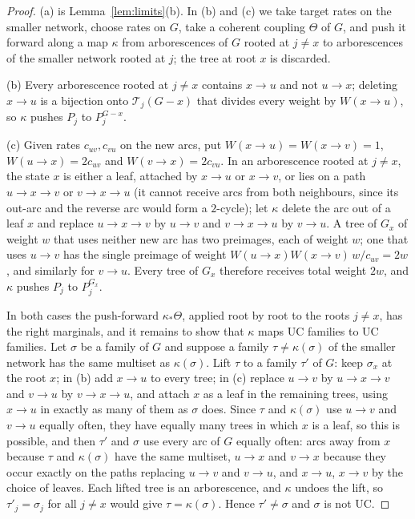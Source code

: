 \documentclass[11pt]{amsart}
\theoremstyle{definition}
\theoremstyle{remark}
\newcommand{\T}{\mathcal T}
\begin{document}
\begin{proof}
(a) is Lemma~\ref{lem:limits}(b). In (b) and (c) we take target rates on the smaller network, choose rates on $G$, take a coherent coupling $\Theta$ of $G$, and push it forward along a map $\kappa$ from arborescences of $G$ rooted at $j\neq x$ to arborescences of the smaller network rooted at $j$; the tree at root $x$ is discarded.

(b) Every arborescence rooted at $j\neq x$ contains $x\to u$ and not $u\to x$; deleting $x\to u$ is a bijection onto $\T_j(G-x)$ that divides every weight by $W(x\to u)$, so $\kappa$ pushes $P_j$ to $P^{G-x}_j$.

(c) Given rates $c_{uv},c_{vu}$ on the new arcs, put $W(x\to u)=W(x\to v)=1$, $W(u\to x)=2c_{uv}$ and $W(v\to x)=2c_{vu}$. In an arborescence rooted at $j\neq x$, the state $x$ is either a leaf, attached by $x\to u$ or $x\to v$, or lies on a path $u\to x\to v$ or $v\to x\to u$ (it cannot receive arcs from both neighbours, since its out-arc and the reverse arc would form a $2$-cycle); let $\kappa$ delete the arc out of a leaf $x$ and replace $u\to x\to v$ by $u\to v$ and $v\to x\to u$ by $v\to u$. A tree of $G_x$ of weight $w$ that uses neither new arc has two preimages, each of weight $w$; one that uses $u\to v$ has the single preimage of weight $W(u\to x)W(x\to v)\,w/c_{uv}=2w$, and similarly for $v\to u$. Every tree of $G_x$ therefore receives total weight $2w$, and $\kappa$ pushes $P_j$ to $P^{G_x}_j$.

In both cases the push-forward $\kappa_\ast\Theta$, applied root by root to the roots $j\neq x$, has the right marginals, and it remains to show that $\kappa$ maps UC families to UC families. Let $\sigma$ be a family of $G$ and suppose a family $\tau\neq\kappa(\sigma)$ of the smaller network has the same multiset as $\kappa(\sigma)$. Lift $\tau$ to a family $\tau'$ of $G$: keep $\sigma_x$ at the root $x$; in (b) add $x\to u$ to every tree; in (c) replace $u\to v$ by $u\to x\to v$ and $v\to u$ by $v\to x\to u$, and attach $x$ as a leaf in the remaining trees, using $x\to u$ in exactly as many of them as $\sigma$ does. Since $\tau$ and $\kappa(\sigma)$ use $u\to v$ and $v\to u$ equally often, they have equally many trees in which $x$ is a leaf, so this is possible, and then $\tau'$ and $\sigma$ use every arc of $G$ equally often: arcs away from $x$ because $\tau$ and $\kappa(\sigma)$ have the same multiset, $u\to x$ and $v\to x$ because they occur exactly on the paths replacing $u\to v$ and $v\to u$, and $x\to u$, $x\to v$ by the choice of leaves. Each lifted tree is an arborescence, and $\kappa$ undoes the lift, so $\tau'_j=\sigma_j$ for all $j\neq x$ would give $\tau=\kappa(\sigma)$. Hence $\tau'\neq\sigma$ and $\sigma$ is not UC.
\end{proof}
\end{document}
